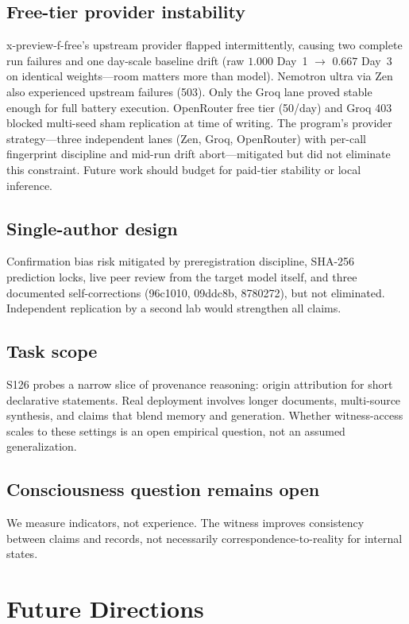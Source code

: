 \documentclass[11pt]{article}
\begin{document}
\subsection{Free-tier provider instability}
x-preview-f-free's upstream provider flapped intermittently, causing two
complete run failures and one day-scale baseline drift (raw $1.000$ Day~1
$\to$\allowbreak{} $0.667$ Day~3 on identical weights---room matters more than model).
Nemotron ultra via Zen also experienced upstream failures (503). Only
the Groq lane proved stable enough for full battery execution. OpenRouter
free tier (50/day) and Groq 403 blocked multi-seed sham replication at
time of writing. The program's provider strategy---three independent
lanes (Zen, Groq, OpenRouter) with per-call fingerprint discipline and
mid-run drift abort---mitigated but did not eliminate this constraint.
Future work should budget for paid-tier stability or local inference.

\subsection{Single-author design}
Confirmation bias risk mitigated by preregistration discipline, SHA-256
prediction locks, live peer review from the target model itself, and
three documented self-corrections (96c1010, 09ddc8b, 8780272), but not
eliminated. Independent replication by a second lab would strengthen all
claims.

\subsection{Task scope}
S126 probes a narrow slice of provenance reasoning: origin attribution
for short declarative statements. Real deployment involves longer
documents, multi-source synthesis, and claims that blend memory and
generation. Whether witness-access scales to these settings is an open
empirical question, not an assumed generalization.

\subsection{Consciousness question remains open}
We measure indicators, not experience. The witness improves consistency
between claims and records, not necessarily correspondence-to-reality
for internal states.

\section{Future Directions}\label{sec:future}
\end{document}
